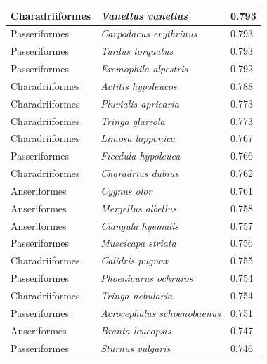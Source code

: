 \documentclass{article}
\begin{document}
\begin{longtable}{|p{} | p{} | p{} |}
  Charadriiformes & \textit{Vanellus vanellus}             & 0.793                \\ \hline
  Passeriformes   & \textit{Carpodacus erythrinus}         & 0.793                \\ \hline
  Passeriformes   & \textit{Turdus torquatus}              & 0.793                \\ \hline
  Passeriformes   & \textit{Eremophila alpestris}          & 0.792                \\ \hline
  Charadriiformes & \textit{Actitis hypoleucos}            & 0.788                \\ \hline
  Charadriiformes & \textit{Pluvialis apricaria}           & 0.773                \\ \hline
  Charadriiformes & \textit{Tringa glareola}               & 0.773                \\ \hline
  Charadriiformes & \textit{Limosa lapponica}              & 0.767                \\ \hline
  Passeriformes   & \textit{Ficedula hypoleuca}            & 0.766                \\ \hline
  Charadriiformes & \textit{Charadrius dubius}             & 0.762                \\ \hline
  Anseriformes    & \textit{Cygnus olor}                   & 0.761                \\ \hline
  Anseriformes    & \textit{Mergellus albellus}            & 0.758                \\ \hline
  Anseriformes    & \textit{Clangula hyemalis}             & 0.757                \\ \hline
  Passeriformes   & \textit{Muscicapa striata}             & 0.756                \\ \hline
  Charadriiformes & \textit{Calidris pugnax}               & 0.755                \\ \hline
  Passeriformes   & \textit{Phoenicurus ochruros}          & 0.754                \\ \hline
  Charadriiformes & \textit{Tringa nebularia}              & 0.754                \\ \hline
  Passeriformes   & \textit{Acrocephalus schoenobaenus}    & 0.751                \\ \hline
  Anseriformes    & \textit{Branta leucopsis}              & 0.747                \\ \hline
  Passeriformes   & \textit{Sturnus vulgaris}              & 0.746                \\ \hline

\end{longtable}
\end{document}
